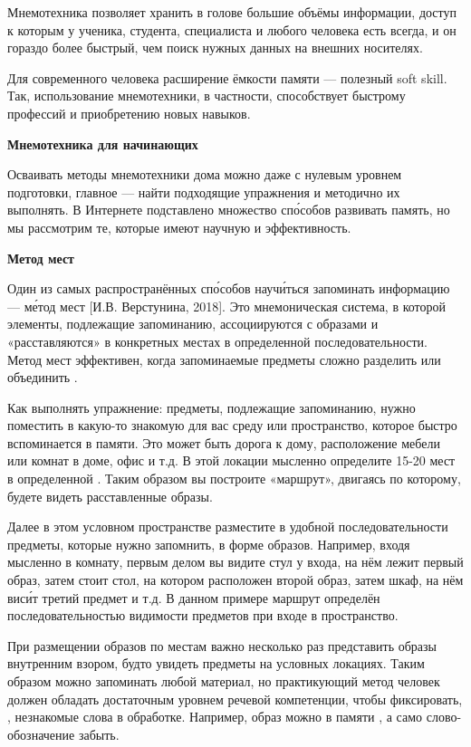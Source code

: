 Мнемотехника позволяет хранить в голове большие объёмы информации, доступ к которым у ученика, студента, специалиста и любого человека есть всегда, и он гораздо более быстрый, чем поиск нужных данных на внешних носителях.

Для современного человека расширение ёмкости памяти --- полезный soft skill. Так, использование мнемотехники, в частности, способствует быстрому  профессий и приобретению новых навыков.

\textbf{Мнемотехника для начинающих}

Осваивать методы мнемотехники дома можно даже с нулевым уровнем подготовки, главное --- найти подходящие упражнения и методично их выполнять. В Интернете подставлено множество сп\'{о}собов развивать память, но мы рассмотрим те, которые имеют научную  и эффективность.

\textbf{Метод мест}

Один из самых распространённых сп\'{о}собов науч\'{и}ться запоминать информацию ---  м\'{е}тод мест [И.В. Верстунина, 2018]. Это мнемоническая система, в которой элементы, подлежащие запоминанию, ассоциируются с образами и «расставляются» в конкретных местах в определенной последовательности. Метод мест эффективен, когда запоминаемые предметы сложно разделить или объединить .

Как выполнять упражнение: предметы, подлежащие запоминанию, нужно поместить в какую-то знакомую для вас среду или пространство, которое быстро вспоминается в памяти. Это может быть дорога к дому, расположение мебели или комнат в доме, офис и т.д. В этой локации мысленно определите 15-20 мест в определенной . Таким образом вы построите «маршрут», двигаясь по которому, будете видеть расставленные образы.

Далее в этом условном пространстве разместите в удобной последовательности предметы, которые нужно запомнить, в форме образов. Например, входя мысленно в комнату, первым делом вы видите стул у входа, на нём лежит первый образ, затем стоит стол, на котором расположен второй образ, затем шкаф, на нём вис\'{и}т третий предмет и т.д. В данном примере маршрут  определён последовательностью видимости предметов при входе в пространство.

При размещении образов по местам важно несколько раз представить образы внутренним взором, будто увидеть предметы на условных локациях. Таким образом можно запоминать любой материал, но практикующий метод человек должен обладать достаточным уровнем речевой компетенции, чтобы фиксировать, , незнакомые слова в обработке. Например, образ можно в памяти , а само слово-обозначение забыть.

